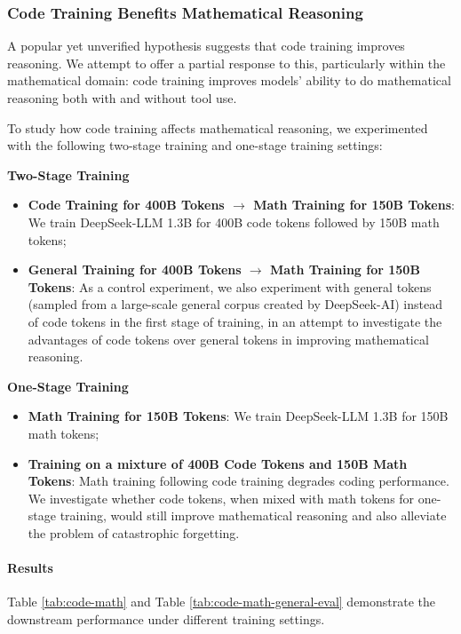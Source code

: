 \subsubsection{Code Training Benefits Mathematical Reasoning}

A popular yet unverified hypothesis suggests that code training improves reasoning. We attempt to offer a partial response to this, particularly within the mathematical domain: code training improves models' ability to do mathematical reasoning both with and without tool use.

To study how code training affects mathematical reasoning, we experimented with the following two-stage training and one-stage training settings:

\textbf{Two-Stage Training}

\begin{itemize}[topsep=0pt]
    \item \textbf{Code Training for 400B Tokens $\rightarrow$ Math Training for 150B Tokens}: We train DeepSeek-LLM 1.3B for 400B code tokens followed by 150B math tokens;
    \item \textbf{General Training for 400B Tokens $\rightarrow$ Math Training for 150B Tokens}: As a control experiment, we also experiment with general tokens (sampled from a large-scale general corpus created by DeepSeek-AI) instead of code tokens in the first stage of training, in an attempt to investigate the advantages of code tokens over general tokens in improving mathematical reasoning.
\end{itemize}

\textbf{One-Stage Training}

\begin{itemize}[topsep=0pt]
    \item \textbf{Math Training for 150B Tokens}: We train DeepSeek-LLM 1.3B for 150B math tokens;
    \item \textbf{Training on a mixture of 400B Code Tokens and 150B Math Tokens}: Math training following code training degrades coding performance. We investigate whether code tokens, when mixed with math tokens for one-stage training, would still improve mathematical reasoning and also alleviate the problem of catastrophic forgetting.
\end{itemize}

\paragraph{Results}
Table \ref{tab:code-math} and Table \ref{tab:code-math-general-eval} demonstrate the downstream performance under different training settings.

